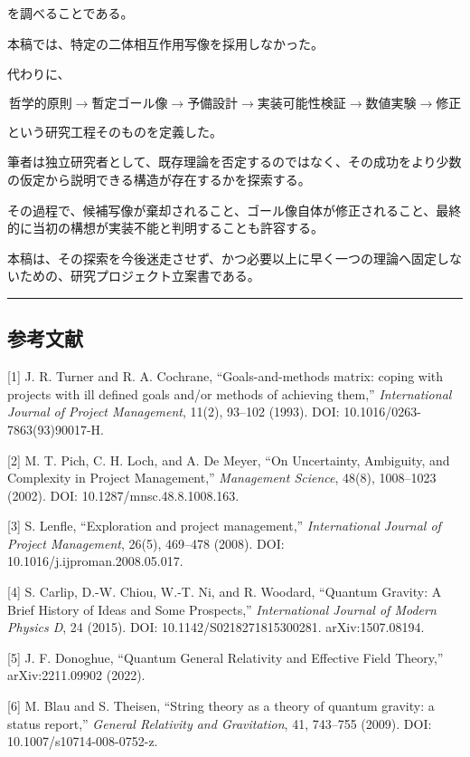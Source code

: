 \documentclass[
  a4paper,
]{ltjsarticle}
\begin{document}
を調べることである。

本稿では、特定の二体相互作用写像を採用しなかった。

代わりに、

\[
\boxed{
\text{哲学的原則}
\rightarrow
\text{暫定ゴール像}
\rightarrow
\text{予備設計}
\rightarrow
\text{実装可能性検証}
\rightarrow
\text{数値実験}
\rightarrow
\text{修正}
}
\]

という研究工程そのものを定義した。

筆者は独立研究者として、既存理論を否定するのではなく、その成功をより少数の仮定から説明できる構造が存在するかを探索する。

その過程で、候補写像が棄却されること、ゴール像自体が修正されること、最終的に当初の構想が実装不能と判明することも許容する。

本稿は、その探索を今後迷走させず、かつ必要以上に早く一つの理論へ固定しないための、研究プロジェクト立案書である。

\begin{center}\rule{0.5\linewidth}{0.5pt}\end{center}

\subsection{参考文献}\label{ux53c2ux8003ux6587ux732e}

{[}1{]} J. R. Turner and R. A. Cochrane, ``Goals-and-methods matrix:
coping with projects with ill defined goals and/or methods of achieving
them,'' \emph{International Journal of Project Management}, 11(2),
93--102 (1993). DOI: 10.1016/0263-7863(93)90017-H.

{[}2{]} M. T. Pich, C. H. Loch, and A. De Meyer, ``On Uncertainty,
Ambiguity, and Complexity in Project Management,'' \emph{Management
Science}, 48(8), 1008--1023 (2002). DOI: 10.1287/mnsc.48.8.1008.163.

{[}3{]} S. Lenfle, ``Exploration and project management,''
\emph{International Journal of Project Management}, 26(5), 469--478
(2008). DOI: 10.1016/j.ijproman.2008.05.017.

{[}4{]} S. Carlip, D.-W. Chiou, W.-T. Ni, and R. Woodard, ``Quantum
Gravity: A Brief History of Ideas and Some Prospects,''
\emph{International Journal of Modern Physics D}, 24 (2015). DOI:
10.1142/S0218271815300281. arXiv:1507.08194.

{[}5{]} J. F. Donoghue, ``Quantum General Relativity and Effective Field
Theory,'' arXiv:2211.09902 (2022).

{[}6{]} M. Blau and S. Theisen, ``String theory as a theory of quantum
gravity: a status report,'' \emph{General Relativity and Gravitation},
41, 743--755 (2009). DOI: 10.1007/s10714-008-0752-z.
\end{document}
